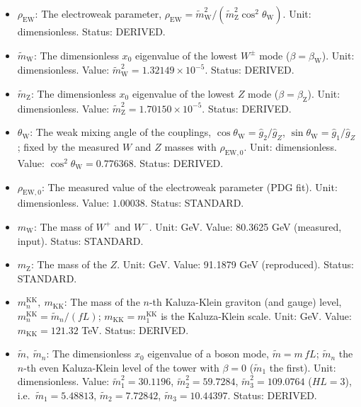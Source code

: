 \documentclass[
  10pt,
]{article}
\providecommand{\tightlist}{%
  \setlength{\itemsep}{0pt}\setlength{\parskip}{0pt}}
\begin{document}
\begin{itemize}
\tightlist
\item
  \(\rho_{\mathrm{EW}}\): The electroweak parameter,
  \(\rho_{\mathrm{EW}} = \tilde m_{\mathrm{W}}^2/(\tilde m_{\mathrm{Z}}^2\cos^2\theta_{\mathrm{W}})\).
  Unit: dimensionless. Status: DERIVED.
\item
  \(\tilde m_{\mathrm{W}}\): The dimensionless \(x_0\) eigenvalue of the
  lowest \(W^\pm\) mode (\(\beta = \beta_{\mathrm{W}}\)). Unit:
  dimensionless. Value:
  \(\tilde m_{\mathrm{W}}^2 = 1.32149\times10^{-5}\). Status: DERIVED.
\item
  \(\tilde m_{\mathrm{Z}}\): The dimensionless \(x_0\) eigenvalue of the
  lowest \(Z\) mode (\(\beta = \beta_{\mathrm{Z}}\)). Unit:
  dimensionless. Value:
  \(\tilde m_{\mathrm{Z}}^2 = 1.70150\times10^{-5}\). Status: DERIVED.
\item
  \(\theta_{\mathrm{W}}\): The weak mixing angle of the couplings,
  \(\cos\theta_{\mathrm{W}} = \hat g_2/\hat g_Z\),
  \(\sin\theta_{\mathrm{W}} = \hat g_1/\hat g_Z\); fixed by the measured
  \(W\) and \(Z\) masses with \(\rho_{\mathrm{EW},0}\). Unit:
  dimensionless. Value: \(\cos^2\theta_{\mathrm{W}} = 0.776368\).
  Status: DERIVED.
\item
  \(\rho_{\mathrm{EW},0}\): The measured value of the electroweak
  parameter (PDG fit). Unit: dimensionless. Value: \(1.00038\). Status:
  STANDARD.
\item
  \(m_{\mathrm{W}}\): The mass of \(W^+\) and \(W^-\). Unit: GeV. Value:
  80.3625 GeV (measured, input). Status: STANDARD.
\item
  \(m_{\mathrm{Z}}\): The mass of the \(Z\). Unit: GeV. Value: 91.1879
  GeV (reproduced). Status: STANDARD.
\item
  \(m^{\mathrm{KK}}_n,\ m_{\mathrm{KK}}\): The mass of the \(n\)-th
  Kaluza-Klein graviton (and gauge) level,
  \(m^{\mathrm{KK}}_n = \tilde m_n/(fL)\);
  \(m_{\mathrm{KK}} = m^{\mathrm{KK}}_1\) is the Kaluza-Klein scale.
  Unit: GeV. Value: \(m_{\mathrm{KK}} = 121.32\) TeV. Status: DERIVED.
\item
  \(\tilde m,\ \tilde m_n\): The dimensionless \(x_0\) eigenvalue of a
  boson mode, \(\tilde m = m\,fL\); \(\tilde m_n\) the \(n\)-th even
  Kaluza-Klein level of the tower with \(\beta = 0\) (\(\tilde m_1\) the
  first). Unit: dimensionless. Value: \(\tilde m_1^2 = 30.1196\),
  \(\tilde m_2^2 = 59.7284\), \(\tilde m_3^2 = 109.0764\) (\(HL = 3\)),
  i.e.~\(\tilde m_1 = 5.48813\), \(\tilde m_2 = 7.72842\),
  \(\tilde m_3 = 10.44397\). Status: DERIVED.
\end{itemize}
\end{document}
